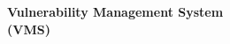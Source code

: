 \thispagestyle{empty}
\vspace*{\fill}
\begin{center}
{\Huge\bfseries Vulnerability Management System}\\[0.5em]
{\Large\bfseries (VMS)}
\end{center}
\vspace*{\fill}
\cleardoublepage
